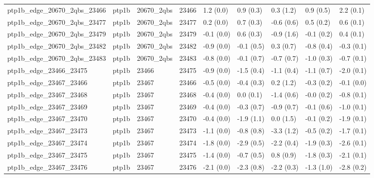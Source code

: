 \begin{tabular}{lllllllll}
ptp1b\_edge\_20670\_2qbs\_23466      &     ptp1b &  20670\_2qbs &       23466 &   1.2 (0.0) &         0.9 (0.3) &   0.3 (1.2) &   0.9 (0.5) &   2.2 (0.1) \\
ptp1b\_edge\_20670\_2qbs\_23477      &     ptp1b &  20670\_2qbs &       23477 &   0.2 (0.0) &         0.7 (0.3) &  -0.6 (0.6) &   0.5 (0.2) &   0.6 (0.1) \\
ptp1b\_edge\_20670\_2qbs\_23479      &     ptp1b &  20670\_2qbs &       23479 &  -0.1 (0.0) &         0.6 (0.3) &  -0.9 (1.6) &  -0.1 (0.2) &   0.4 (0.1) \\
ptp1b\_edge\_20670\_2qbs\_23482      &     ptp1b &  20670\_2qbs &       23482 &  -0.9 (0.0) &        -0.1 (0.5) &   0.3 (0.7) &  -0.8 (0.4) &  -0.3 (0.1) \\
ptp1b\_edge\_20670\_2qbs\_23483      &     ptp1b &  20670\_2qbs &       23483 &  -0.8 (0.0) &        -0.1 (0.7) &  -0.7 (0.7) &  -1.0 (0.3) &  -0.7 (0.1) \\
ptp1b\_edge\_23466\_23475           &     ptp1b &       23466 &       23475 &  -0.9 (0.0) &        -1.5 (0.4) &  -1.1 (0.4) &  -1.1 (0.7) &  -2.0 (0.1) \\
ptp1b\_edge\_23467\_23466           &     ptp1b &       23467 &       23466 &  -0.5 (0.0) &        -0.4 (0.3) &   0.2 (1.2) &  -0.3 (0.2) &  -0.1 (0.0) \\
ptp1b\_edge\_23467\_23468           &     ptp1b &       23467 &       23468 &  -0.4 (0.0) &         0.0 (0.1) &  -1.4 (0.6) &  -0.0 (0.2) &  -0.8 (0.1) \\
ptp1b\_edge\_23467\_23469           &     ptp1b &       23467 &       23469 &  -0.4 (0.0) &        -0.3 (0.7) &  -0.9 (0.7) &  -0.1 (0.6) &  -1.0 (0.1) \\
ptp1b\_edge\_23467\_23470           &     ptp1b &       23467 &       23470 &  -0.4 (0.0) &        -1.9 (1.1) &   0.0 (1.5) &  -0.1 (0.2) &  -1.9 (0.1) \\
ptp1b\_edge\_23467\_23473           &     ptp1b &       23467 &       23473 &  -1.1 (0.0) &        -0.8 (0.8) &  -3.3 (1.2) &  -0.5 (0.2) &  -1.7 (0.1) \\
ptp1b\_edge\_23467\_23474           &     ptp1b &       23467 &       23474 &  -1.8 (0.0) &        -2.9 (0.5) &  -2.2 (0.4) &  -1.9 (0.3) &  -2.6 (0.1) \\
ptp1b\_edge\_23467\_23475           &     ptp1b &       23467 &       23475 &  -1.4 (0.0) &        -0.7 (0.5) &   0.8 (0.9) &  -1.8 (0.3) &  -2.1 (0.1) \\
ptp1b\_edge\_23467\_23476           &     ptp1b &       23467 &       23476 &  -2.1 (0.0) &        -2.3 (0.8) &  -2.2 (0.3) &  -1.3 (1.0) &  -2.8 (0.2) \\

\end{tabular}
